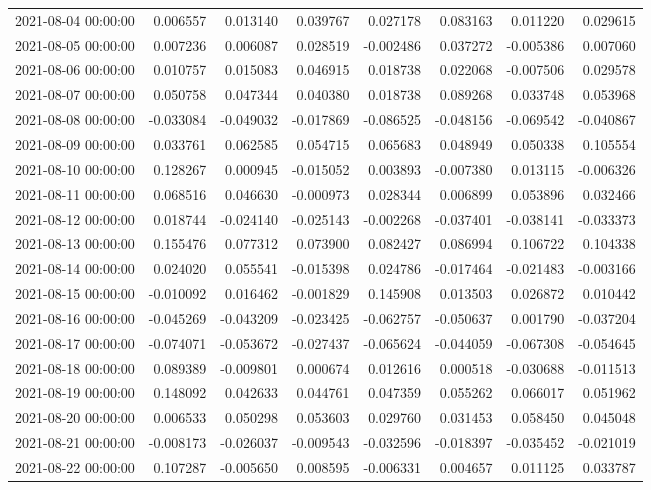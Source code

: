 \begin{tabular}{lrrrrrrr}
2021-08-04 00:00:00 & 0.006557 & 0.013140 & 0.039767 & 0.027178 & 0.083163 & 0.011220 & 0.029615 \\
2021-08-05 00:00:00 & 0.007236 & 0.006087 & 0.028519 & -0.002486 & 0.037272 & -0.005386 & 0.007060 \\
2021-08-06 00:00:00 & 0.010757 & 0.015083 & 0.046915 & 0.018738 & 0.022068 & -0.007506 & 0.029578 \\
2021-08-07 00:00:00 & 0.050758 & 0.047344 & 0.040380 & 0.018738 & 0.089268 & 0.033748 & 0.053968 \\
2021-08-08 00:00:00 & -0.033084 & -0.049032 & -0.017869 & -0.086525 & -0.048156 & -0.069542 & -0.040867 \\
2021-08-09 00:00:00 & 0.033761 & 0.062585 & 0.054715 & 0.065683 & 0.048949 & 0.050338 & 0.105554 \\
2021-08-10 00:00:00 & 0.128267 & 0.000945 & -0.015052 & 0.003893 & -0.007380 & 0.013115 & -0.006326 \\
2021-08-11 00:00:00 & 0.068516 & 0.046630 & -0.000973 & 0.028344 & 0.006899 & 0.053896 & 0.032466 \\
2021-08-12 00:00:00 & 0.018744 & -0.024140 & -0.025143 & -0.002268 & -0.037401 & -0.038141 & -0.033373 \\
2021-08-13 00:00:00 & 0.155476 & 0.077312 & 0.073900 & 0.082427 & 0.086994 & 0.106722 & 0.104338 \\
2021-08-14 00:00:00 & 0.024020 & 0.055541 & -0.015398 & 0.024786 & -0.017464 & -0.021483 & -0.003166 \\
2021-08-15 00:00:00 & -0.010092 & 0.016462 & -0.001829 & 0.145908 & 0.013503 & 0.026872 & 0.010442 \\
2021-08-16 00:00:00 & -0.045269 & -0.043209 & -0.023425 & -0.062757 & -0.050637 & 0.001790 & -0.037204 \\
2021-08-17 00:00:00 & -0.074071 & -0.053672 & -0.027437 & -0.065624 & -0.044059 & -0.067308 & -0.054645 \\
2021-08-18 00:00:00 & 0.089389 & -0.009801 & 0.000674 & 0.012616 & 0.000518 & -0.030688 & -0.011513 \\
2021-08-19 00:00:00 & 0.148092 & 0.042633 & 0.044761 & 0.047359 & 0.055262 & 0.066017 & 0.051962 \\
2021-08-20 00:00:00 & 0.006533 & 0.050298 & 0.053603 & 0.029760 & 0.031453 & 0.058450 & 0.045048 \\
2021-08-21 00:00:00 & -0.008173 & -0.026037 & -0.009543 & -0.032596 & -0.018397 & -0.035452 & -0.021019 \\
2021-08-22 00:00:00 & 0.107287 & -0.005650 & 0.008595 & -0.006331 & 0.004657 & 0.011125 & 0.033787 \\

\end{tabular}
